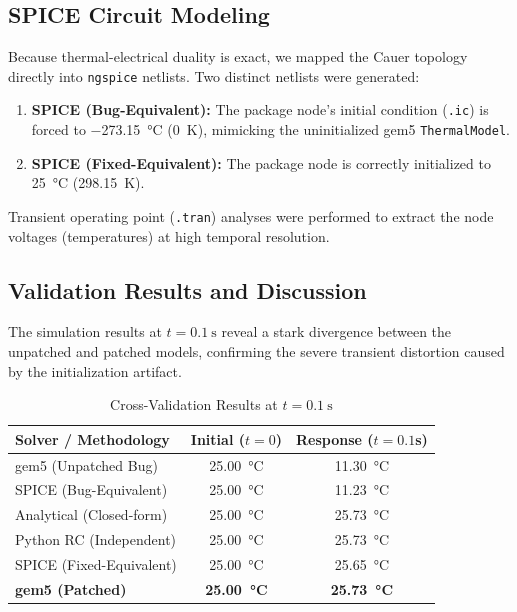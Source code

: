 \subsection{SPICE Circuit Modeling}

Because thermal-electrical duality is exact, we mapped the Cauer topology directly into \texttt{ngspice} netlists. Two distinct netlists were generated:
\begin{enumerate}
    \item \textbf{SPICE (Bug-Equivalent):} The package node's initial condition (\texttt{.ic}) is forced to \SI{-273.15}{\degreeCelsius} (\SI{0}{\kelvin}), mimicking the uninitialized gem5 \texttt{ThermalModel}.
    \item \textbf{SPICE (Fixed-Equivalent):} The package node is correctly initialized to \SI{25}{\degreeCelsius} (\SI{298.15}{\kelvin}).
\end{enumerate}
Transient operating point (\texttt{.tran}) analyses were performed to extract the node voltages (temperatures) at high temporal resolution.

\subsection{Validation Results and Discussion}

The simulation results at $t = \SI{0.1}{\second}$ reveal a stark divergence between the unpatched and patched models, confirming the severe transient distortion caused by the initialization artifact.

\begin{table}[h]
\centering
\caption{Cross-Validation Results at $t = \SI{0.1}{\second}$}
\label{tab:validation}
\begin{tabular}{@{}lcc@{}}
\toprule
\textbf{Solver / Methodology} & \textbf{Initial ($t=0$)} & \textbf{Response ($t=0.1$s)} \\ \midrule
gem5 (Unpatched Bug)          & \SI{25.00}{\degreeCelsius} & \SI{11.30}{\degreeCelsius}  \\
SPICE (Bug-Equivalent)        & \SI{25.00}{\degreeCelsius} & \SI{11.23}{\degreeCelsius}  \\ \midrule
Analytical (Closed-form)      & \SI{25.00}{\degreeCelsius} & \SI{25.73}{\degreeCelsius}  \\
Python RC (Independent)       & \SI{25.00}{\degreeCelsius} & \SI{25.73}{\degreeCelsius}  \\
SPICE (Fixed-Equivalent)      & \SI{25.00}{\degreeCelsius} & \SI{25.65}{\degreeCelsius}  \\
\textbf{gem5 (Patched)}       & \textbf{\SI{25.00}{\degreeCelsius}} & \textbf{\SI{25.73}{\degreeCelsius}}  \\ \bottomrule
\end{tabular}
\end{table}

